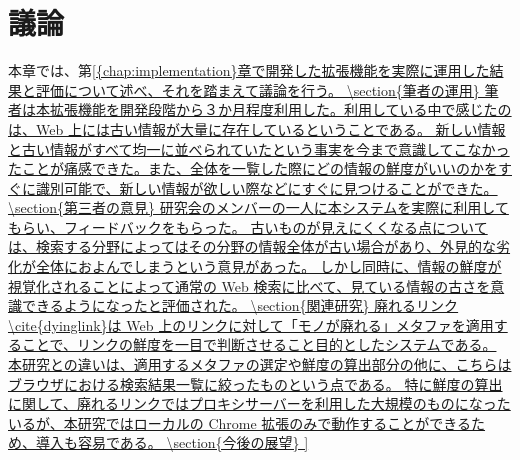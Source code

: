 \chapter{議論}
\label{chap:discussion}

本章では、第\ref{{chap:implementation}章で開発した拡張機能を実際に運用した結果と評価について述べ、それを踏まえて議論を行う。

\section{筆者の運用}

筆者は本拡張機能を開発段階から３か月程度利用した。利用している中で感じたのは、Web 上には古い情報が大量に存在しているということである。

新しい情報と古い情報がすべて均一に並べられていたという事実を今まで意識してこなかったことが痛感できた。また、全体を一覧した際にどの情報の鮮度がいいのかをすぐに識別可能で、新しい情報が欲しい際などにすぐに見つけることができた。

\section{第三者の意見}

研究会のメンバーの一人に本システムを実際に利用してもらい、フィードバックをもらった。

古いものが見えにくくなる点については、検索する分野によってはその分野の情報全体が古い場合があり、外見的な劣化が全体におよんでしまうという意見があった。

しかし同時に、情報の鮮度が視覚化されることによって通常の Web 検索に比べて、見ている情報の古さを意識できるようになったと評価された。

\section{関連研究}

廃れるリンク\cite{dyinglink}は Web 上のリンクに対して「モノが廃れる」メタファを適用することで、リンクの鮮度を一目で判断させること目的としたシステムである。

本研究との違いは、適用するメタファの選定や鮮度の算出部分の他に、こちらはブラウザにおける検索結果一覧に絞ったものという点である。

特に鮮度の算出に関して、廃れるリンクではプロキシサーバーを利用した大規模のものになったいるが、本研究ではローカルの Chrome 拡張のみで動作することができるため、導入も容易である。

\section{今後の展望}

}
